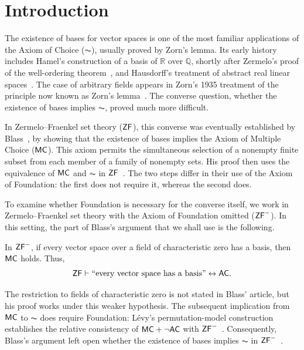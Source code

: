 \section{Introduction}

The existence of bases for vector spaces is one of the most familiar
applications of the Axiom of Choice ($\AC$), usually proved by Zorn's
lemma. Its early history includes Hamel's construction of a basis of
$\mathbb R$ over $\mathbb Q$, shortly after Zermelo's proof of the
well-ordering theorem~\cite{Hamel1905,Zermelo1904}, and Hausdorff's
treatment of abstract real linear spaces~\cite[p.~295]{Hausdorff1932}.
The case of arbitrary fields appears in Zorn's 1935 treatment of the
principle now known as Zorn's lemma~\cite{Zorn1935}. The converse
question, whether the existence of bases implies $\AC$, proved much
more difficult.

In Zermelo--Fraenkel set theory ($\mathsf{ZF}$), this converse was eventually
established by Blass~\cite{Blass}, by showing that the existence of
bases implies the Axiom of Multiple Choice ($\mathsf{MC}$). This axiom
permits the simultaneous selection of a nonempty finite subset from
each member of a family of nonempty sets. His proof then uses the
equivalence of $\mathsf{MC}$ and $\AC$ in $\mathsf{ZF}$~\cite{FelgnerJech1973}.
The two steps differ in their use of the Axiom of Foundation: the
first does not require it, whereas the second does.

To examine whether Foundation is necessary for the converse itself,
we work in Zermelo--Fraenkel set theory with the Axiom of Foundation
omitted ($\mathsf{ZF}^{-}$). In this setting, the part of Blass's argument that
we shall use is the following.

\begin{theorem}\label{thm:blass}
In $\mathsf{ZF}^{-}$, if every vector space over a field of characteristic zero has a basis, then $\mathsf{MC}$ holds.
Thus,
\[
    \mathsf{ZF}\vdash \text{``every vector space has a basis''} \leftrightarrow \mathsf{AC}.
\]
\end{theorem}

The restriction to fields of characteristic zero is not stated in Blass' article, but his proof works under this weaker hypothesis. The
subsequent implication from $\mathsf{MC}$ to $\AC$ does require Foundation:
L\'evy's permutation-model construction establishes the relative
consistency of $\mathsf{MC}+\neg\mathsf{AC}$ with $\mathsf{ZF}^{-}$~\cite{Levy1962}. Consequently,
Blass's argument left open whether the existence of bases implies
$\AC$ in $\mathsf{ZF}^{-}$~\cites[p.~33]{Blass}{Karagila2017MO}[p.~423]{Morillon}[p.~121]{Philip2025}.

